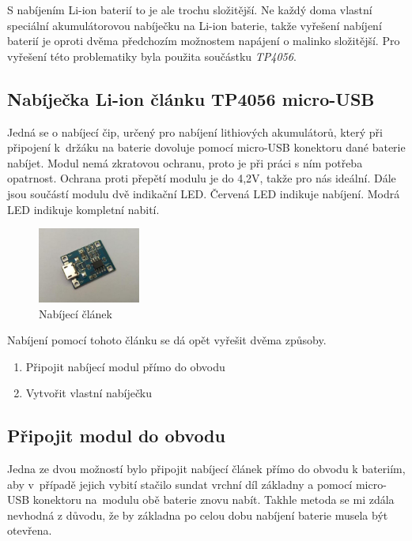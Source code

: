 S nabíjením Li-ion baterií to je ale trochu složitější. Ne každý doma vlastní speciální akumulátorovou nabíječku na Li-ion baterie, takže vyřešení nabíjení baterií je oproti dvěma předchozím možnostem napájení o malinko složitější. 
Pro vyřešení této problematiky byla použita součástku \textit{TP4056}\cite{TP4056}.


\subsection{Nabíječka Li-ion článku TP4056 micro-USB}
Jedná se o nabíjecí čip, určený pro nabíjení lithiových akumulátorů, který při připojení k~držáku na baterie dovoluje pomocí micro-USB konektoru dané baterie nabíjet. Modul nemá zkratovou ochranu, proto je při práci s ním potřeba opatrnost. Ochrana proti přepětí modulu je do 4,2V, takže pro nás ideální. Dále jsou součástí modulu dvě indikační LED. Červená LED indikuje nabíjení. Modrá LED indikuje kompletní nabití. 

\begin{figure}[htbp]
	\centering
	\includegraphics[width=0.3\textwidth]{img/02 ele/Napajeci clanek.jpg}
	\caption{Nabíjecí článek}
\end{figure}

Nabíjení pomocí tohoto článku se dá opět vyřešit dvěma způsoby.

\begin{enumerate}
	\item Připojit nabíjecí modul přímo do obvodu
	\item Vytvořit vlastní nabíječku
\end{enumerate}


\subsection{Připojit modul do obvodu}
Jedna ze dvou možností bylo připojit nabíjecí článek přímo do obvodu k bateriím, aby v~případě jejich vybití stačilo sundat vrchní díl základny a pomocí micro-USB konektoru na~modulu obě baterie znovu nabít.
Takhle metoda se mi zdála nevhodná z důvodu, že by základna po celou dobu nabíjení baterie musela být otevřena. 


